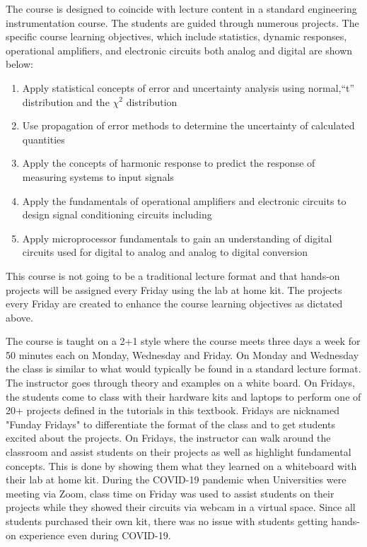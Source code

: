 The course is designed to coincide with lecture content in a standard
engineering instrumentation course. The students are guided through
numerous projects. The specific course learning objectives, which include
statistics, dynamic responses, operational amplifiers, and electronic
circuits both analog and digital are shown below:
\begin{enumerate}[itemsep=-5pt]
\item Apply statistical concepts of error and uncertainty analysis using normal,“t” distribution and the $\chi^2$ distribution
\item Use propagation of error methods to determine the uncertainty of calculated quantities
\item Apply the concepts of harmonic response to predict the response of measuring systems to input signals
\item Apply the fundamentals of operational amplifiers and electronic circuits to design signal conditioning circuits including %
\item Apply microprocessor fundamentals to gain an understanding of digital circuits used for digital to analog and analog to digital conversion
\end{enumerate}

This course is not going to be a traditional lecture format and that
hands-on projects will be assigned every Friday using the lab at home
kit. The projects every Friday are created to enhance the course
learning objectives as dictated above.  

The course is taught on a 2+1 style where the course meets three days
a week for 50 minutes each on Monday, Wednesday and Friday. On Monday
and Wednesday the class is similar to what would typically be found in
a standard lecture format. The instructor goes through theory and examples on a
white board. On Fridays, the students come to class with their
hardware kits and laptops to perform one of 20+ projects defined in
the tutorials in this textbook. Fridays are nicknamed "Funday Fridays"
to differentiate the format of the class and to get students excited about the
projects. On Fridays, the instructor can walk around the classroom and
assist students on their projects as well as highlight fundamental
concepts. This is done by showing them what they learned on a
whiteboard with their lab at home kit. During the COVID-19 pandemic
when Universities were meeting via Zoom, class time on Friday was used
to assist students on their projects while they showed their circuits via
webcam in a virtual space. Since all students purchased their own kit,
there was no issue with students getting hands-on experience even
during COVID-19.  

